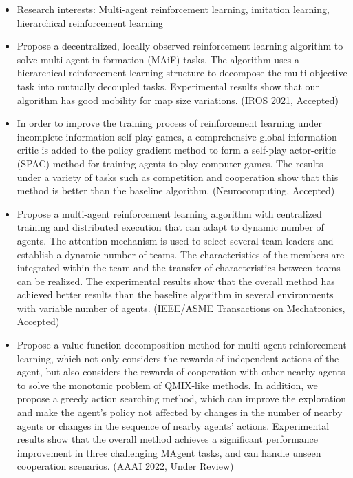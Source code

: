 
{\small
  \begin{itemize}
    \item Research interests: Multi-agent reinforcement learning, imitation learning, hierarchical reinforcement learning
    \item Propose a decentralized, locally observed reinforcement learning algorithm to solve multi-agent in formation (MAiF) tasks. The algorithm uses a hierarchical reinforcement learning structure to decompose the multi-objective task into mutually decoupled tasks. Experimental results show that our algorithm has good mobility for map size variations. (IROS 2021, Accepted)
    \item In order to improve the training process of reinforcement learning under incomplete information self-play games, a comprehensive global information critic is added to the policy gradient method to form a self-play actor-critic (SPAC) method for training agents to play computer games. The results under a variety of tasks such as competition and cooperation show that this method is better than the baseline algorithm. (Neurocomputing, Accepted)
    \item Propose a multi-agent reinforcement learning algorithm with centralized training and distributed execution that can adapt to dynamic number of agents. The attention mechanism is used to select several team leaders and establish a dynamic number of teams. The characteristics of the members are integrated within the team and the transfer of characteristics between teams can be realized. The experimental results show that the overall method has achieved better results than the baseline algorithm in several environments with variable number of agents. (IEEE/ASME Transactions on Mechatronics, Accepted)
    \item Propose a value function decomposition method for multi-agent reinforcement learning, which not only considers the rewards of independent actions of the agent, but also considers the rewards of cooperation with other nearby agents to solve the monotonic problem of QMIX-like methods. In addition, we propose a greedy action searching method, which can improve the exploration and make the agent's policy not affected by changes in the number of nearby agents or changes in the sequence of nearby agents' actions. Experimental results show that the overall method achieves a significant performance improvement in three challenging MAgent tasks, and can handle unseen cooperation scenarios. (AAAI 2022, Under Review)

\end{itemize}}
